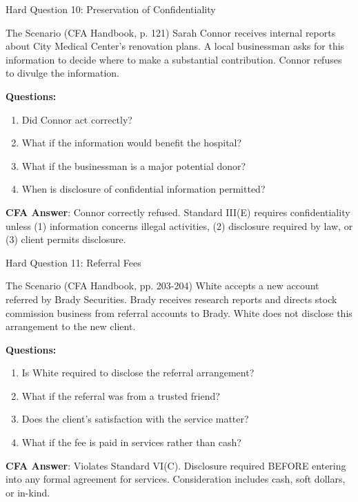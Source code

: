 \documentclass{beamer}
\begin{document}
	\begin{frame}{Hard Question 10: Preservation of Confidentiality}
		\begin{block}{The Scenario (CFA Handbook, p. 121)}
			Sarah Connor receives internal reports about City Medical Center's renovation plans. A local businessman asks for this information to decide where to make a substantial contribution. Connor refuses to divulge the information.
		\end{block}
		
		\vspace{0.2cm}
		\textbf{Questions:}
		\begin{enumerate}
			\item Did Connor act correctly?
			\item What if the information would benefit the hospital?
			\item What if the businessman is a major potential donor?
			\item When is disclosure of confidential information permitted?
		\end{enumerate}
		
		\vspace{0.2cm}
		\textcolor{cfablue}{\textbf{CFA Answer}}: Connor correctly refused. Standard III(E) requires confidentiality unless (1) information concerns illegal activities, (2) disclosure required by law, or (3) client permits disclosure.
	\end{frame}
	
	\begin{frame}{Hard Question 11: Referral Fees}
		\begin{block}{The Scenario (CFA Handbook, pp. 203-204)}
			White accepts a new account referred by Brady Securities. Brady receives research reports and directs stock commission business from referral accounts to Brady. White does not disclose this arrangement to the new client.
		\end{block}
		
		\vspace{0.2cm}
		\textbf{Questions:}
		\begin{enumerate}
			\item Is White required to disclose the referral arrangement?
			\item What if the referral was from a trusted friend?
			\item Does the client's satisfaction with the service matter?
			\item What if the fee is paid in services rather than cash?
		\end{enumerate}
		
		\vspace{0.2cm}
		\textcolor{cfablue}{\textbf{CFA Answer}}: Violates Standard VI(C). Disclosure required BEFORE entering into any formal agreement for services. Consideration includes cash, soft dollars, or in-kind.
	\end{frame}
	
\end{document}
